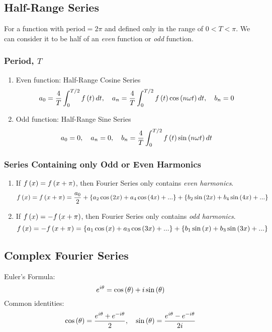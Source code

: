 \subsection{Half-Range Series}
For a function with $\text{period}=2\pi$ and defined only in the range of $0<T<\pi$. We can consider it to be half of an \textit{even} function or \textit{odd} function.
\subsubsection{Period, $T$}
\begin{enumerate}
    \item Even function: Half-Range Cosine Series
    \begin{equation}
        a_0=\frac{4}{T}\int_{0}^{T/2}f\left(t\right)dt,\quad a_n=\frac{4}{T}\int_{0}^{T/2}f\left(t\right)\cos\left(n\omega t\right)dt,\quad b_n=0
    \end{equation}
    \item Odd function: Half-Range Sine Series
    \begin{equation}
        a_0=0,\quad a_n=0,\quad b_n=\frac{4}{T}\int_{0}^{T/2}f\left(t\right)\sin\left(n\omega t\right)dt
    \end{equation}
\end{enumerate}
\subsubsection{Series Containing only Odd or Even Harmonics}
\begin{enumerate}
    \item If $f\left(x\right)=f\left(x+\pi\right)$, then Fourier Series only contains \textit{even harmonics}.
    \begin{equation}
        f\left(x\right)=f\left(x+\pi\right)=\frac{a_0}{2}+\left\{a_2\cos\left(2x\right)+a_4\cos\left(4x\right)+...\right\}+\left\{b_2\sin\left(2x\right)+b_4\sin\left(4x\right)+...\right\}
    \end{equation}
    \item If $f\left(x\right)=-f\left(x+\pi\right)$, then Fourier Series only contains \textit{odd harmonics}.
    \begin{equation}
        f\left(x\right)=-f\left(x+\pi\right)=\left\{a_1\cos\left(x\right)+a_3\cos\left(3x\right)+...\right\}+\left\{b_1\sin\left(x\right)+b_3\sin\left(3x\right)+...\right\}
    \end{equation}
\end{enumerate}
\subsection{Complex Fourier Series}
Euler's Formula:
\begin{equation}
    e^{i\theta}=\cos\left(\theta\right)+i\sin\left(\theta\right)
\end{equation}
Common identities:
\begin{equation}
    \cos\left(\theta\right)=\frac{e^{i\theta}+e^{-i\theta}}{2},\quad\sin\left(\theta\right)=\frac{e^{i\theta}-e^{-i\theta}}{2i}
\end{equation}

